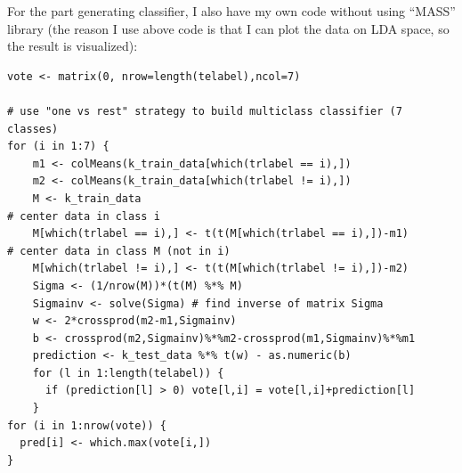 \documentclass{article}
\begin{document}
For the part generating classifier, I also have my own code without using ``MASS'' library (the reason I use above code is that I can plot the data
on LDA space, so the result is visualized):

{\color{lightgray} \begin{verbatim}
vote <- matrix(0, nrow=length(telabel),ncol=7)

# use "one vs rest" strategy to build multiclass classifier (7 classes)
for (i in 1:7) {
    m1 <- colMeans(k_train_data[which(trlabel == i),])
    m2 <- colMeans(k_train_data[which(trlabel != i),])
    M <- k_train_data
# center data in class i
    M[which(trlabel == i),] <- t(t(M[which(trlabel == i),])-m1)
# center data in class M (not in i)
    M[which(trlabel != i),] <- t(t(M[which(trlabel != i),])-m2)
    Sigma <- (1/nrow(M))*(t(M) %*% M)
    Sigmainv <- solve(Sigma) # find inverse of matrix Sigma
    w <- 2*crossprod(m2-m1,Sigmainv)
    b <- crossprod(m2,Sigmainv)%*%m2-crossprod(m1,Sigmainv)%*%m1
    prediction <- k_test_data %*% t(w) - as.numeric(b)
    for (l in 1:length(telabel)) {
      if (prediction[l] > 0) vote[l,i] = vote[l,i]+prediction[l]
    }
for (i in 1:nrow(vote)) {
  pred[i] <- which.max(vote[i,])
}
\end{verbatim}}
\end{document}
